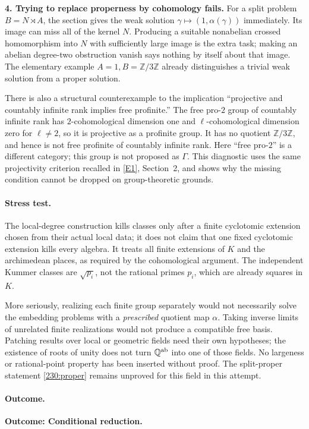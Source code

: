 \documentclass[11pt,a4paper]{article}
\newcommand{\Z}{\mathbb{Z}}
\newcommand{\Q}{\mathbb{Q}}
\newcommand{\eref}[2]{\hyperlink{extra:#1:#2}{[E#2]}}
\numberwithin{equation}{section}
\begin{document}
\textbf{4. Trying to replace properness by cohomology fails.}
For a split problem $B=N\rtimes A$, the section gives the weak solution
$\gamma\mapsto(1,\alpha(\gamma))$ immediately. Its image can miss all
of the kernel $N$. Producing a suitable nonabelian crossed homomorphism
into $N$ with sufficiently large image is the extra task; making an
abelian degree-two obstruction vanish says nothing by itself about that
image. The elementary example $A=1,B=\Z/3\Z$ already distinguishes a
trivial weak solution from a proper solution.

There is also a structural counterexample to the implication
``projective and countably infinite rank implies free profinite.''
The free pro-$2$ group of countably infinite rank has $2$-cohomological
dimension one and $\ell$-cohomological dimension zero for $\ell\ne2$,
so it is projective as a profinite group. It has no quotient $\Z/3\Z$,
and hence is not free profinite of countably infinite rank. Here
``free pro-$2$'' is a different category; this group is not proposed as
$\Gamma$. This diagnostic uses the same projectivity criterion recalled
in \eref{230}{1}, Section~2, and shows why the missing condition cannot
be dropped on group-theoretic grounds.

\paragraph{Stress test.}
The local-degree construction kills classes only after a finite
cyclotomic extension chosen from their actual local data; it does not
claim that one fixed cyclotomic extension kills every algebra. It treats
all finite extensions of $K$ and the archimedean places, as required by
the cohomological argument. The independent Kummer classes are
$\sqrt{p_i}$, not the rational primes $p_i$, which are already squares
in $K$.

More seriously, realizing each finite group separately would not
necessarily solve the embedding problems with a \emph{prescribed}
quotient map $\alpha$. Taking inverse limits of unrelated finite
realizations would not produce a compatible free basis. Patching
results over local or geometric fields need their own hypotheses; the
existence of roots of unity does not turn $\Q^{\rm ab}$ into one of
those fields. No largeness or rational-point property has been inserted
without proof. The split-proper statement \eqref{230:proper} remains
unproved for this field in this attempt.

\paragraph{Outcome.}
\textbf{Outcome: Conditional reduction.}
\end{document}
